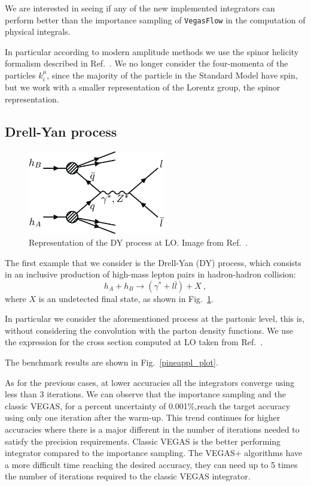 \documentclass[../main/main.tex]{subfiles}
\begin{document}
We are interested in seeing if any of the new implemented integrators can perform better than the importance sampling of \texttt{VegasFlow} in the computation of physical integrals.

In particular according to modern amplitude methods we use the spinor helicity formalism described in Ref.~\cite{Dixon:1613349}. We no longer consider the four-momenta of the particles $k_i^\mu$, since the majority of the particle in the Standard Model have spin, but we work with a smaller representation of the Lorentz group, the spinor representation.
    
\subsection{Drell-Yan process}

\begin{figure}
	\centering
	\includegraphics[width=6cm]{../images/Drell-Yan-process-a-quark-of-one-hadron-and-an-antiquark-of-another-hadron-annihilate.png}
	\caption{Representation of the DY process at LO. Image from Ref.~\cite{article}.}
	\label{DY}
\end{figure}
The first example that we consider is the Drell-Yan (DY) process, which consists in an inclusive production of high-mass lepton pairs in hadron-hadron collision:
\begin{equation}
	h_A + h_B \rightarrow ( \gamma^* + l \bar{l}) + X  \ ,
\end{equation}
where $X$ is an undetected final state, as shown in Fig.~\ref{DY}.

In particular we consider the aforementioned process at the partonic level, this is, without considering the convolution with the parton density functions. We use the expression for the cross section computed at LO taken from Ref.~\cite{Carrazza_2020}.

The benchmark results are shown in Fig.~\ref{pineappl_plot}. 

As for the previous cases, at lower accuracies all the integrators converge using less than 3 iterations. We can observe that the importance sampling and the classic VEGAS, for a percent uncertainty of 0.001\%,reach the target accuracy using only one iteration after the warm-up.
This trend continues for higher accuracies where there is a major different in the number of iterations needed to satisfy the precision requirements. Classic VEGAS is the better performing integrator compared to the importance sampling. The VEGAS+ algorithms have a more difficult time reaching the desired accuracy, they can need up to 5 times the number of iterations required to the classic VEGAS integrator.
\end{document}
